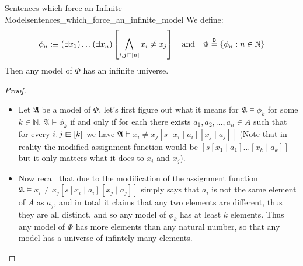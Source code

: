 \begin{proposition}{Sentences which force an Infinite
    Model}{sentences_which_force_an_infinite_model}
    We define: 
    \[
     \phi _{ n }  :\equiv \left( \exists x _{ 1 }   \right) \ldots \left(
     \exists x _{ n }   \right) \left[ \bigwedge _{ i, j \din \left[ n \right] } x _{ i
     } \neq x _{ j } \right]  \quad \text{and} \quad \Phi \stackrel{\mathtt{D}}{=}
     \left\{ \phi  _{ n } : n \in  \mathbb{N} \right\} 
    \]
    Then any model of \( \Phi  \) has an infinite universe.
\end{proposition}
\begin{proof}
\begin{itemize}
    \item Let \( \mathfrak{ A }   \) be a model of \( \Phi  \), let's first
    figure out what it means for \( \mathfrak{ A } \models \phi _{ k }   \) for
    some \( k \in  \mathbb{N}  \). 
    \( \mathfrak{ A } \models \phi _{ k }   \) if and only if for each there
    exists \( a_{1} , a_{2} , \dotsc , a_{n} \in  A \) such that for every \( i,
    j \din \left[ k \right] \) we have \( \mathfrak{ A } \models x _{ i } \neq x
    _{ j } \left[ s \left[ x _{ i }  \mid a _{ i }  \right] \left[ x _{ j }
   \mid a _{ j }  \right]   \right] \) (Note that in reality the modified
   assignment function would be \( \left[ s \left[ x _{ 1 } \mid a _{ 1 }
   \right] \ldots \left[ x _{ k }  \mid a _{ k }  \right]   \right]  \) but it
   only matters what it does to \( x _{ i }  \) and \( x _{ j }  \)). 
   \item Now recall that due to the modification of the assignment function \(
   \mathfrak{ A } \models x _{ i } \neq x _{ j } \left[ s \left[ x _{ i }  \mid
   a _{ i } \right] \left[ x _{ j } \mid a _{ j }  \right]  \right]   \) simply
   says that \( a _{ i }  \) is not the same element of \( A \) as \( a _{ j }
   \), and in total it claims that any two elements are different, thus they are
   all distinct, and so any model of \( \phi _{ k }  \) has at least \( k \)
   elements. Thus any model of \( \Phi  \) has more elements than any natural
   number, so that any model has a universe of infintely many elements.
\end{itemize}
\end{proof}




